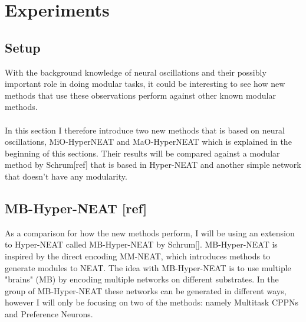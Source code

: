 \documentclass[11pt, a4paper]{article}
\begin{document}
\author{Mads Anthony}
\section{Experiments}
\subsection{Setup}
With the background knowledge of neural oscillations and their possibly important role in doing modular tasks, it could be interesting to see how new methods that use these observations perform against other known modular methods.
\\
\\
In this section I therefore introduce two new methods that is based on neural oscillations, MiO-HyperNEAT and MaO-HyperNEAT which is explained in the beginning of this sections. Their results will be compared against a modular method by Schrum[ref] that is based in Hyper-NEAT and another simple network that doesn't have any modularity.
\subsection{MB-Hyper-NEAT [ref]}
As a comparison for how the new methods perform, I will be  using an extension to Hyper-NEAT called MB-Hyper-NEAT by Schrum[]. MB-Hyper-NEAT is inspired by the direct encoding MM-NEAT, which introduces methods to generate modules to NEAT. The idea with MB-Hyper-NEAT is to use multiple "brains" (MB) by encoding multiple networks on different substrates. In the group of MB-Hyper-NEAT these networks can be generated in different ways, however I will only be focusing on two of the methods: namely Multitask CPPNs and Preference Neurons.
\end{document}
